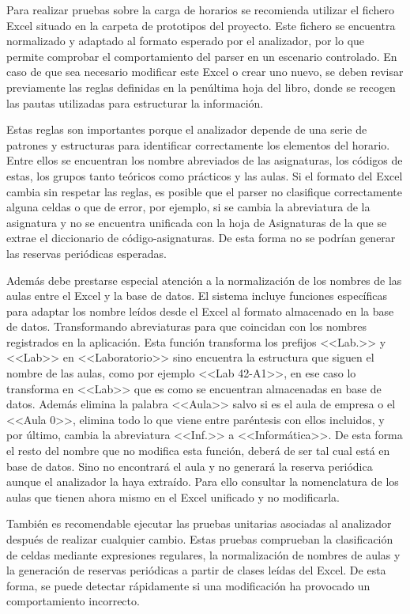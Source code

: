 Para realizar pruebas sobre la carga de horarios se recomienda utilizar el fichero Excel situado en la carpeta de prototipos del proyecto. Este fichero se encuentra normalizado y adaptado al formato esperado por el analizador, por lo que permite comprobar el comportamiento del parser en un escenario controlado. En caso de que sea necesario modificar este Excel o crear uno nuevo, se deben revisar previamente las reglas definidas en la penúltima hoja del libro, donde se recogen las pautas utilizadas para estructurar la información.

Estas reglas son importantes porque el analizador depende de una serie de patrones y estructuras para identificar correctamente los elementos del horario. Entre ellos se encuentran los nombre abreviados de las asignaturas, los códigos de estas, los grupos tanto teóricos como prácticos y las aulas. Si el formato del Excel cambia sin respetar las reglas, es posible que el parser no clasifique correctamente alguna celdas o que de error, por ejemplo, si se cambia la abreviatura de la asignatura y no se encuentra unificada con la hoja de Asignaturas de la que se extrae el diccionario de código-asignaturas. De esta forma no se podrían generar las reservas periódicas esperadas.

Además debe prestarse especial atención a la normalización de los nombres de las aulas entre el Excel y la base de datos. El sistema incluye funciones específicas para adaptar los nombre leídos desde el Excel al formato almacenado en la base de datos. Transformando abreviaturas para que coincidan con los nombres registrados en la aplicación. Esta función transforma los prefijos <<Lab.>> y <<Lab>> en <<Laboratorio>> sino encuentra la estructura que siguen el nombre de las aulas, como por ejemplo <<Lab 42-A1>>, en ese caso lo transforma en <<Lab>> que es como se encuentran almacenadas en base de datos. Además elimina la palabra <<Aula>> salvo si es el aula de empresa o el <<Aula 0>>, elimina todo lo que viene entre paréntesis con ellos incluidos, y por último, cambia la abreviatura <<Inf.>> a <<Informática>>. De esta forma el resto del nombre que no modifica esta función, deberá de ser tal cual está en base de datos. Sino no encontrará el aula y no generará la reserva periódica aunque el analizador la haya extraído. Para ello consultar la nomenclatura de los aulas que tienen ahora mismo en el Excel unificado y no modificarla.

También es recomendable ejecutar las pruebas unitarias asociadas al analizador después de realizar cualquier cambio. Estas pruebas comprueban la clasificación de celdas mediante expresiones regulares, la normalización de nombres de aulas y la generación de reservas periódicas a partir de clases leídas del Excel. De esta forma, se puede detectar rápidamente si una modificación ha provocado un comportamiento incorrecto.

